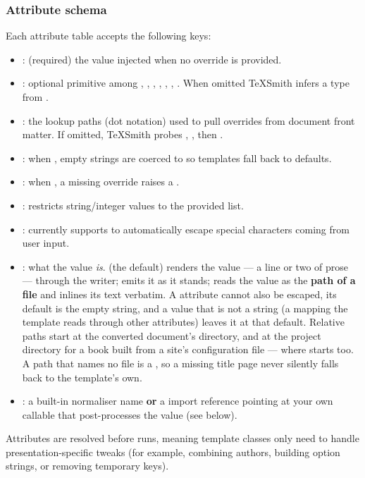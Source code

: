\documentclass[a4paper,twoside]{article}
\begin{document}
\subsubsection{Attribute schema}
Each attribute table accepts the following keys:
\begin{itemize}
\item {}: (required) the value injected when no override is provided.
\item {}: optional primitive among , , , , , , . When omitted TeXSmith infers a type from .
\item {}: the lookup paths (dot notation) used to pull overrides from document front matter. If omitted, TeXSmith probes , , then .
\item {}: when , empty strings are coerced to  so templates fall back to defaults.
\item {}: when , a missing override raises a .
\item {}: restricts string/integer values to the provided list.
\item {}: currently supports  to automatically escape special characters coming from user input.
\item {}: what the value \emph{is}.  (the default) renders the value --- a line or two of prose --- through the writer;  emits it as it stands;  reads the value as the \textbf{path of a file} and inlines its text verbatim. A  attribute cannot also be escaped, its default is the empty string, and a value that is not a string (a mapping the template reads through other attributes) leaves it at that default. Relative paths start at the converted document's directory, and at the project directory for a book built from a site's configuration file --- where  starts too. A path that names no file is a , so a missing title page never silently falls back to the template's own.
\item {}: a built-in normaliser name \textbf{or} a  import reference pointing at your own callable that post-processes the value (see below).
\end{itemize}
Attributes are resolved before  runs, meaning template classes only need to handle presentation-specific tweaks (for example, combining authors, building option strings, or removing temporary keys).
\end{document}
